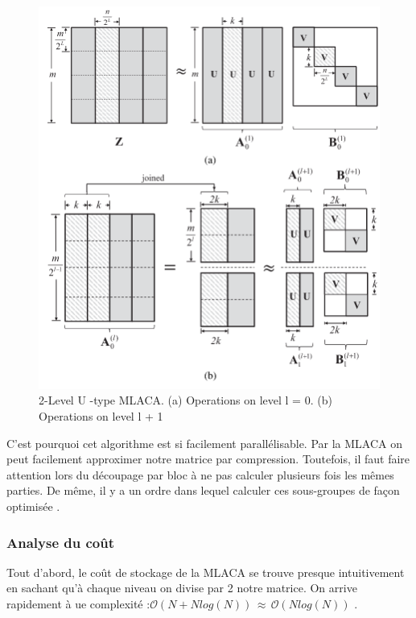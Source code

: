 \documentclass[10pt]{SelfArx} %
\begin{document}
\begin{figure}[ht]\centering
	\includegraphics[width=\linewidth]{mlaca_paralel.png}
	\captionsetup{justification=centering}
	\caption{2-Level U -type MLACA. (a) Operations on level l = 0. (b) Operations on level l + 1 \cite{nel_mlaca_2019}}
	\label{fig:mlaca_paralel}
\end{figure}

C'est pourquoi cet algorithme est si facilement parallélisable. Par la MLACA on peut facilement approximer notre matrice par compression. Toutefois, il faut faire attention lors du découpage par bloc à ne pas calculer plusieurs fois les mêmes parties. De même, il y a un ordre dans lequel calculer ces sous-groupes de façon optimisée \cite{tamayo_multilevel_2011}.

\subsubsection{Analyse du coût}
Tout d'abord, le coût de stockage de la MLACA se trouve presque intuitivement en sachant qu'à chaque niveau on divise par 2 notre matrice. On arrive rapidement à ue complexité :$\mathcal{O}(N+Nlog(N)) \, \approx \, \mathcal{O}(Nlog(N))$ \cite{tamayo_multilevel_2011}.
\end{document}
